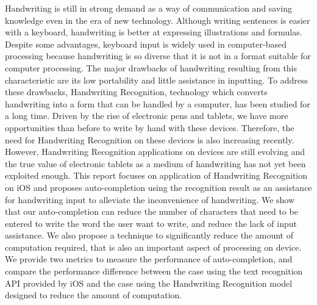 Handwriting is still in strong demand as a way of communication and saving knowledge
even in the era of new technology. Although writing sentences is easier with a keyboard,
handwriting is better at expressing illustrations and formulas.
Despite some advantages, keyboard input is widely used in computer-based processing because
handwriting is so diverse that it is not in a format suitable for computer processing.
The major drawbacks of handwriting resulting from this characteristic are its low
portability and little assistance in inputting. To address these drawbacks,
Handwriting Recognition, technology which converts handwriting into a form that
can be handled by a computer, has been studied for a long time.
Driven by the rise of electronic pens and tablets, we have more opportunities than before to
write by hand with these devices.
Therefore, the need for Handwriting Recognition on these devices is also increasing recently.
However, Handwriting Recognition applications on devices are still evolving
and the true value of electronic tablets as a medium of
handwriting has not yet been exploited enough.
This report focuses on application of Handwriting Recognition on iOS and proposes
auto-completion using the recognition result as an assistance for handwriting input
to alleviate the inconvenience of handwriting. We show that our auto-completion can
reduce the number of characters that need to be entered to write the word the user want
to write, and reduce the lack of input assistance. We also propose a technique to significantly reduce
the amount of computation required, that is also an important aspect of processing on device.
We provide two metrics to measure the
performance of auto-completion, and compare the performance difference between the case
using the text recognition API provided by iOS and the case using the Handwriting Recognition model
designed to reduce the amount of computation.

